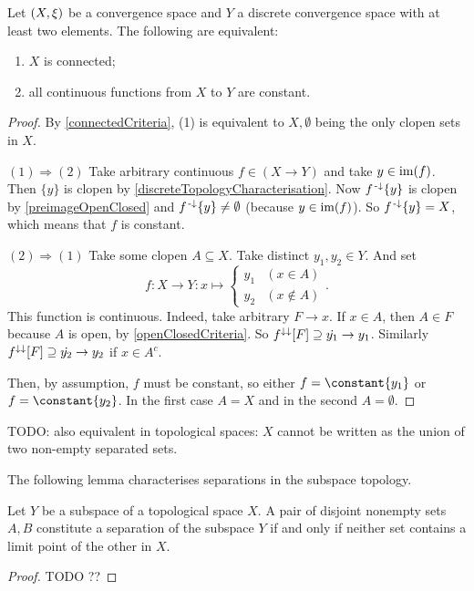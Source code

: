 \begin{proposition} \label{continuousFunctionsConnectedToDiscrete}
Let $\sSet{X, \xi}$ be a convergence space and $Y$ a discrete convergence space with at least two elements. The following are equivalent:
\begin{enumerate}
\item $X$ is connected;
\item all continuous functions from $X$ to $Y$ are constant.
\end{enumerate}
\end{proposition}
\begin{proof}
By \ref{connectedCriteria}, (1) is equivalent to $X,\emptyset$ being the only clopen sets in $X$.

$(1) \Rightarrow (2)$ Take arbitrary continuous $f\in (X\to Y)$ and take $y\in \operatorname{im}(f)$. Then $\{y\}$ is clopen by \ref{discreteTopologyCharacterisation}. Now $f^{\text{\hspace{0.15em}-}\downarrow}\{y\}$ is clopen by \ref{preimageOpenClosed} and $f^{\text{\hspace{0.15em}-}\downarrow}\{y\}\neq \emptyset$ (because $y\in\operatorname{im}(f)$). So $f^{\text{\hspace{0.15em}-}\downarrow}\{y\} = X$, which means that $f$ is constant.

$(2) \Rightarrow (1)$ Take some clopen $A\subseteq X$. Take distinct $y_1,y_2\in Y$. And set
\[ f: X\to Y: x\mapsto \begin{cases}
y_1 & (x\in A) \\
y_2 & (x\notin A)
\end{cases}. \]
This function is continuous. Indeed, take arbitrary $F\to x$. If $x\in A$, then $A\in F$ because $A$ is open, by \ref{openClosedCriteria}. So $f^{\downarrow\downarrow}[F] \supseteq \dot{y_1} \to y_1$. Similarly $f^{\downarrow\downarrow}[F] \supseteq \dot{y_2} \to y_2$ if $x\in A^c$.

Then, by assumption, $f$ must be constant, so either $f = \constant{y_1}$ or $f = \constant{y_2}$. In the first case $A = X$ and in the second $A = \emptyset$.
\end{proof}

TODO: also equivalent in topological spaces: $X$ cannot be written as the union of two non-empty separated sets.

The following lemma characterises separations in the subspace topology.
\begin{lemma}
Let $Y$ be a subspace of a topological space $X$. A pair of disjoint nonempty sets $A,B$ constitute a separation of the subspace $Y$ \textup{if and only if} neither set contains a limit point of the other in $X$.
\end{lemma}
\begin{proof}
TODO ??
\end{proof}

